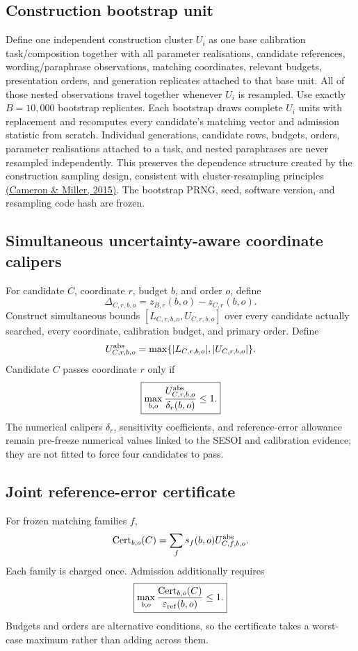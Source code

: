 \documentclass[11pt,a4paper]{article}
\begin{document}
\subsection{Construction bootstrap unit}
Define one independent construction cluster $U_i$ as one base calibration task/composition together with all parameter realisations, candidate references, wording/paraphrase observations, matching coordinates, relevant budgets, presentation orders, and generation replicates attached to that base unit. All of those nested observations travel together whenever $U_i$ is resampled.
Use exactly $B=10{,}000$ bootstrap replicates. Each bootstrap draws complete $U_i$ units with replacement and recomputes every candidate's matching vector and admission statistic from scratch. Individual generations, candidate rows, budgets, orders, parameter realisations attached to a task, and nested paraphrases are never resampled independently. This preserves the dependence structure created by the construction sampling design, consistent with cluster-resampling principles \href{https://cameron.econ.ucdavis.edu/research/Cameron_Miller_JHR_2015.pdf}{(Cameron \& Miller, 2015)}. The bootstrap PRNG, seed, software version, and resampling code hash are frozen.

\subsection{Simultaneous uncertainty-aware coordinate calipers}
For candidate $C$, coordinate $r$, budget $b$, and order $o$, define
\[
\Delta_{C,r,b,o}=z_{B,r}(b,o)-z_{C,r}(b,o).
\]
Construct simultaneous bounds $[L_{C,r,b,o},U_{C,r,b,o}]$ over every candidate actually searched, every coordinate, calibration budget, and primary order. Define
\[
U^{\rm abs}_{C,r,b,o}=\max\{|L_{C,r,b,o}|,|U_{C,r,b,o}|\}.
\]
Candidate $C$ passes coordinate $r$ only if
\[
\boxed{\max_{b,o}\frac{U^{\rm abs}_{C,r,b,o}}{\delta_r(b,o)}\le1.}
\]
The numerical calipers $\delta_r$, sensitivity coefficients, and reference-error allowance remain pre-freeze numerical values linked to the SESOI and calibration evidence; they are not fitted to force four candidates to pass.

\subsection{Joint reference-error certificate}
For frozen matching families $f$,
\[
\operatorname{Cert}_{b,o}(C)=\sum_f s_f(b,o)U^{\rm abs}_{C,f,b,o}.
\]
Each family is charged once. Admission additionally requires
\[
\boxed{\max_{b,o}\frac{\operatorname{Cert}_{b,o}(C)}{\varepsilon_{\rm ref}(b,o)}\le1.}
\]
Budgets and orders are alternative conditions, so the certificate takes a worst-case maximum rather than adding across them.
\end{document}

